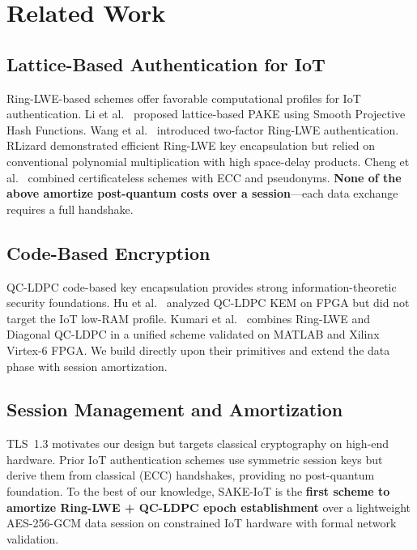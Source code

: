\documentclass[conference]{IEEEtran}
\begin{document}
\section{Related Work}
\label{sec:related}

\subsection{Lattice-Based Authentication for IoT}

Ring-LWE-based schemes offer favorable computational profiles for IoT
authentication. Li et al.~\cite{li2020} proposed lattice-based PAKE
using Smooth Projective Hash Functions. Wang et al.~\cite{wang2019}
introduced two-factor Ring-LWE authentication. RLizard
\cite{lee2019} demonstrated efficient Ring-LWE key encapsulation but
relied on conventional polynomial multiplication with high space-delay
products. Cheng et al.~\cite{cheng2021} combined certificateless
schemes with ECC and pseudonyms. \textbf{None of the above amortize
post-quantum costs over a session}---each data exchange requires a
full handshake.

\subsection{Code-Based Encryption}

QC-LDPC code-based key encapsulation provides strong
information-theoretic security foundations. Hu et al.~\cite{hu2019}
analyzed QC-LDPC KEM on FPGA but did not target the IoT low-RAM
profile. Kumari et al.~\cite{kumari2022} combines Ring-LWE and
Diagonal QC-LDPC in a unified scheme validated on MATLAB and Xilinx
Virtex-6 FPGA. We build directly upon their primitives and extend the
data phase with session amortization.

\subsection{Session Management and Amortization}

TLS~1.3 \cite{rfc8446} motivates our design but targets classical
cryptography on high-end hardware. Prior IoT authentication schemes
\cite{reza2021, farash2019} use symmetric session keys but derive them
from classical (ECC) handshakes, providing no post-quantum foundation.
To the best of our knowledge, SAKE-IoT is the \textbf{first scheme to
amortize Ring-LWE + QC-LDPC epoch establishment} over a lightweight
AES-256-GCM data session on constrained IoT hardware with formal
network validation.
\end{document}
